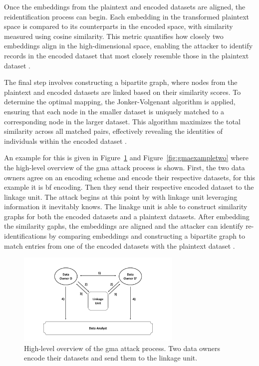 Once the embeddings from the plaintext and encoded datasets are aligned, the reidentification process can begin.
Each embedding in the transformed plaintext space is compared to its counterparts in the encoded space, with similarity measured using cosine similarity.
This metric quantifies how closely two embeddings align in the high-dimensional space, enabling the attacker to identify records in the encoded dataset that most closely resemble those in the plaintext dataset \cite{schaefer2024}.

The final step involves constructing a bipartite graph, where nodes from the plaintext and encoded datasets are linked based on their similarity scores.
To determine the optimal mapping, the Jonker-Volgenant algorithm is applied, ensuring that each node in the smaller dataset is uniquely matched to a corresponding node in the larger dataset.
This algorithm maximizes the total similarity across all matched pairs, effectively revealing the identities of individuals within the encoded dataset \cite{schaefer2024}.

An example for this is given in Figure~\ref{fig:gmaexampleone} and Figure~\ref{fig:gmaexampletwo} where the high-level overview of the \ac{gma} attack process is shown.
First, the two data owners agree on an encoding scheme and encode their respective datasets, for this example it is \ac{bf} encoding.
Then they send their respective encoded dataset to the linkage unit.
The attack begins at this point by with linkage unit leveraging information it inevitably knows.
The linakge unit is able to construct similarity graphs for both the encoded datasets and a plaintext datasets.
After embedding the similarity gaphs, the embeddings are aligned and the attacker can identify re-identifications by comparing embeddings and constructing a bipartite graph to match entries from one of the encoded datasets with the plaintext dataset \cite{schaefer2024}.

\begin{figure}[H]
  \centering
  \includegraphics[width=0.7\textwidth, page=9]{img/visualization.pdf}
  \caption{High-level overview of the \ac{gma} attack process.
  Two data owners encode their datasets and send them to the linkage unit.}
  \label{fig:gmaexampleone}
\end{figure}

